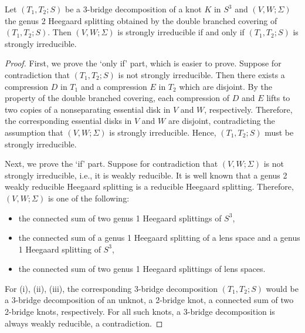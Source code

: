\documentclass[10pt,a4paper]{amsart}
\begin{document}
\begin{Thm}\label{main result-intro-2}
Let $(T_1, T_2; S)$ be a 3-bridge decomposition of a knot $K$ in $S^3$ and
$(V, W;\Sigma)$ the genus 2 Heegaard splitting obtained by the double branched covering of
$(T_1, T_2; S)$. Then $(V, W;\Sigma)$ is strongly irreducible if and only if $(T_1, T_2; S)$
is strongly irreducible.
\end{Thm}

\begin{proof}
First, we prove the `only if' part, which is easier to prove. Suppose for contradiction that $(T_1, T_2; S)$
is not strongly irreducible. Then there exists a compression $D$ in $T_1$ and a compression $E$ in $T_2$ which
are disjoint. By the property of the double branched covering, each compression of $D$ and $E$ lifts to two copies of a nonseparating essential disk in $V$ and $W$, respectively.
Therefore, the corresponding essential disks in $V$ and $W$ are disjoint, contradicting the assumption that $(V, W; \Sigma)$ is strongly irreducible. Hence, $(T_1, T_2; S)$ must be strongly irreducible.

Next, we prove the `if' part. Suppose for contradiction that $(V, W;\Sigma)$ is not strongly irreducible, i.e.,
it is weakly reducible. It is well known that a genus 2 weakly
reducible Heegaard splitting is a reducible Heegaard splitting.
Therefore, $(V, W;\Sigma)$ is one of
the following:


\begin{itemize}
\item[(i)] the connected sum of two genus 1 Heegaard splittings of $S^3$,
\item[(ii)] the connected sum of a genus 1 Heegaard splitting of a lens space and a genus 1
Heegaard splitting of $S^3$,
\item[(iii)] the connected sum of two genus 1 Heegaard splittings of lens spaces.
\end{itemize}

For (i), (ii), (iii),  the corresponding $3$-bridge decomposition $(T_1, T_2; S)$ would be a $3$-bridge decomposition of an unknot, a 2-bridge
knot, a connected sum of two 2-bridge knots, respectively. For all such knots, a 3-bridge
decomposition is always weakly reducible, a contradiction.
\end{proof}
\end{document}
